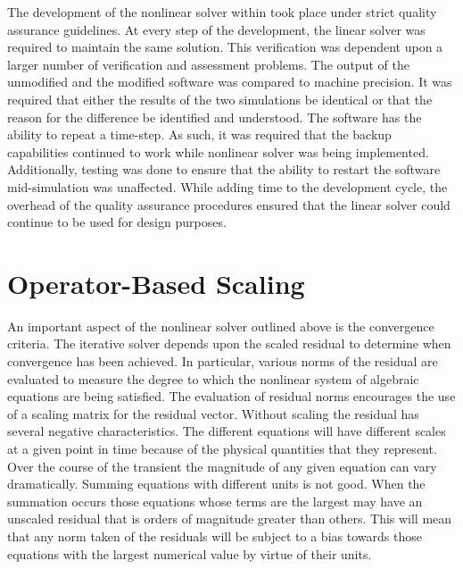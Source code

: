 The development of the nonlinear solver within \cobra{} took place under strict quality assurance guidelines.
At every step of the development, the linear solver was required to maintain the same solution.
This verification was dependent upon a larger number of verification and assessment problems.
The output of the unmodified \cobra{} and the modified \cobra{} software was compared to machine precision.
It was required that either the results of the two simulations be identical or that the reason for the difference be identified and understood.
The \cobra{} software has the ability to repeat a time-step.
As such, it was required that the backup capabilities continued to work while nonlinear solver was being implemented.
Additionally, testing was done to ensure that the ability to restart the software mid-simulation was unaffected.
While adding time to the development cycle, the overhead of the quality assurance procedures ensured that the linear solver could continue to be used for design purposes.

\section{Operator-Based Scaling}
\label{sect:nln_scaling}
An important aspect of the nonlinear solver outlined above is the convergence criteria.
The iterative solver depends upon the scaled residual to determine when convergence has been achieved.
In particular, various norms of the residual are evaluated to measure the degree to which the nonlinear system of algebraic equations are being satisfied.
The evaluation of residual norms encourages the use of a scaling matrix for the residual vector.
Without scaling the residual has several negative characteristics.
The different equations will have different scales at a given point in time because of the physical quantities that they represent.
Over the course of the transient the magnitude of any given equation can vary dramatically.
Summing equations with different units is not good.
When the summation occurs those equations whose terms are the largest may have an unscaled residual that is orders of magnitude greater than others.
This will mean that any norm taken of the residuals will be subject to a bias towards those equations with the largest numerical value by virtue of their units.

